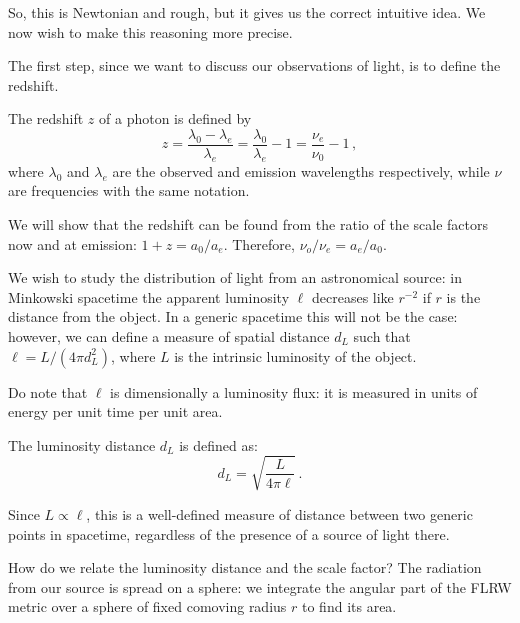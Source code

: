 \documentclass[main.tex]{subfiles}
\begin{document}
So, this is Newtonian and rough, but it gives us the correct intuitive idea.
We now wish to make this reasoning more precise.

The first step, since we want to discuss our observations of light, is to define the redshift.

\begin{definition}[Redshift]
The redshift \(z\) of a photon is defined by
%
\begin{equation}
  z = \frac{\lambda_0 - \lambda_e}{\lambda_{e}}
  = \frac{\lambda_0 }{\lambda_{e}} - 1
  = \frac{\nu_{e}}{\nu_{0}} - 1
  \,,
\end{equation}
%
where \(\lambda_0\) and \(\lambda_e\) are the observed and emission wavelengths respectively, while \(\nu \) are frequencies with the same notation.
\end{definition}

We will show
that the redshift can be found from the ratio of the scale factors now and at emission: \(1+z = a_0/ a_e\).
Therefore, \(\nu_o / \nu_e = a_e / a_0\).

We wish to study the distribution of light from an astronomical source: in Minkowski spacetime the apparent luminosity \(\ell\) decreases like \(r^{-2}\) if \(r\) is the distance from the object.
In a generic spacetime this will not be the case: however, we can define a measure of spatial distance \(d_L\) such that \(\ell = L / (4 \pi d_L^2)\), where \(L\) is the intrinsic luminosity of the object.

Do note that \(\ell \) is dimensionally a luminosity flux: it is measured in units of energy per unit time per unit area.

\begin{definition}  
The luminosity distance \(d_L\) is defined as:
%
\begin{equation}
d_L = \sqrt{\frac{L}{4 \pi \ell} } \,.
\end{equation}

Since \(L \propto \ell\), this is a well-defined measure of distance between two generic points in spacetime, regardless of the presence of a source of light there.
\end{definition}
  
How do we relate the luminosity distance and the scale factor?
The radiation from our source is spread on a sphere: we integrate the angular part of the FLRW metric over a sphere of fixed comoving radius \(r\) to find its area.
\end{document}
